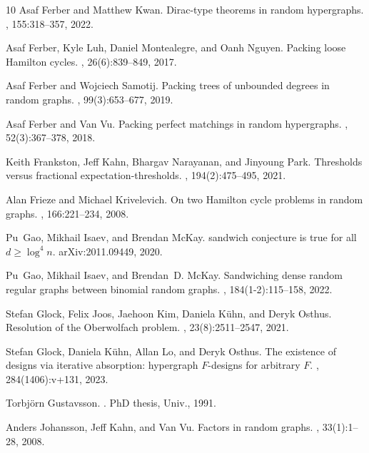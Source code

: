 \documentclass[11pt]{article}
\numberwithin{equation}{section}
\newcounter{i}
\theoremstyle{plain}
\theoremstyle{plain} %
\theoremstyle{definition}
\begin{document}
\begin{thebibliography}{10}
Asaf Ferber and Matthew Kwan.
\newblock Dirac-type theorems in random hypergraphs.
, 155:318--357, 2022.

Asaf Ferber, Kyle Luh, Daniel Montealegre, and Oanh Nguyen.
\newblock Packing loose {H}amilton cycles.
, 26(6):839--849, 2017.

Asaf Ferber and Wojciech Samotij.
\newblock Packing trees of unbounded degrees in random graphs.
, 99(3):653--677, 2019.

Asaf Ferber and Van Vu.
\newblock Packing perfect matchings in random hypergraphs.
, 52(3):367--378, 2018.

Keith Frankston, Jeff Kahn, Bhargav Narayanan, and Jinyoung Park.
\newblock Thresholds versus fractional expectation-thresholds.
, 194(2):475--495, 2021.

Alan Frieze and Michael Krivelevich.
\newblock On two {H}amilton cycle problems in random graphs.
, 166:221--234, 2008.

Pu~Gao, Mikhail Isaev, and Brendan McKay.
 sandwich conjecture is true for all {$d\geq\log^4n$}.
\newblock arXiv:2011.09449, 2020.

Pu~Gao, Mikhail Isaev, and Brendan~D. McKay.
\newblock Sandwiching dense random regular graphs between binomial random
  graphs.
, 184(1-2):115--158, 2022.

Stefan Glock, Felix Joos, Jaehoon Kim, Daniela K\"{u}hn, and Deryk Osthus.
\newblock Resolution of the {O}berwolfach problem.
, 23(8):2511--2547, 2021.

Stefan Glock, Daniela K\"{u}hn, Allan Lo, and Deryk Osthus.
\newblock The existence of designs via iterative absorption: hypergraph
  {$F$}-designs for arbitrary {$F$}.
, 284(1406):v+131, 2023.

Torbj{\"o}rn Gustavsson.
.
\newblock PhD thesis, Univ., 1991.

Anders Johansson, Jeff Kahn, and Van Vu.
\newblock Factors in random graphs.
, 33(1):1--28, 2008.


\end{thebibliography}
\end{document}
